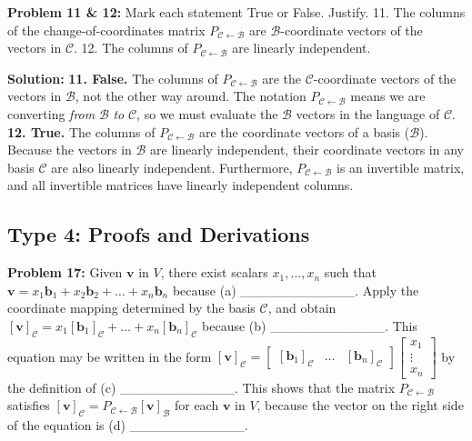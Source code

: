 \documentclass[11pt]{article}
\begin{document}
\textbf{Problem 11 \& 12:} Mark each statement True or False. Justify.
11. The columns of the change-of-coordinates matrix $P_{\mathcal{C} \leftarrow \mathcal{B}}$ are $\mathcal{B}$-coordinate vectors of the vectors in $\mathcal{C}$.
12. The columns of $P_{\mathcal{C} \leftarrow \mathcal{B}}$ are linearly independent.

\textbf{Solution:}
\textbf{11. False.} The columns of $P_{\mathcal{C} \leftarrow \mathcal{B}}$ are the $\mathcal{C}$-coordinate vectors of the vectors in $\mathcal{B}$, not the other way around. The notation $P_{\mathcal{C} \leftarrow \mathcal{B}}$ means we are converting \textit{from} $\mathcal{B}$ \textit{to} $\mathcal{C}$, so we must evaluate the $\mathcal{B}$ vectors in the language of $\mathcal{C}$.
\textbf{12. True.} The columns of $P_{\mathcal{C} \leftarrow \mathcal{B}}$ are the coordinate vectors of a basis ($\mathcal{B}$). Because the vectors in $\mathcal{B}$ are linearly independent, their coordinate vectors in any basis $\mathcal{C}$ are also linearly independent. Furthermore, $P_{\mathcal{C} \leftarrow \mathcal{B}}$ is an invertible matrix, and all invertible matrices have linearly independent columns.

\subsection{Type 4: Proofs and Derivations}

\textbf{Problem 17:} Given $\mathbf{v}$ in $V$, there exist scalars $x_1, \dots, x_n$ such that $\mathbf{v} = x_1\mathbf{b}_1 + x_2\mathbf{b}_2 + \dots + x_n\mathbf{b}_n$ because (a) \_\_\_\_\_\_\_\_\_\_\_\_. Apply the coordinate mapping determined by the basis $\mathcal{C}$, and obtain $[\mathbf{v}]_{\mathcal{C}} = x_1[\mathbf{b}_1]_{\mathcal{C}} + \dots + x_n[\mathbf{b}_n]_{\mathcal{C}}$ because (b) \_\_\_\_\_\_\_\_\_\_\_\_. This equation may be written in the form $[\mathbf{v}]_{\mathcal{C}} = \begin{bmatrix} [\mathbf{b}_1]_{\mathcal{C}} & \dots & [\mathbf{b}_n]_{\mathcal{C}} \end{bmatrix} \begin{bmatrix} x_1 \\ \vdots \\ x_n \end{bmatrix}$ by the definition of (c) \_\_\_\_\_\_\_\_\_\_\_\_. This shows that the matrix $P_{\mathcal{C} \leftarrow \mathcal{B}}$ satisfies $[\mathbf{v}]_{\mathcal{C}} = P_{\mathcal{C} \leftarrow \mathcal{B}}[\mathbf{v}]_{\mathcal{B}}$ for each $\mathbf{v}$ in $V$, because the vector on the right side of the equation is (d) \_\_\_\_\_\_\_\_\_\_\_\_.
\end{document}
